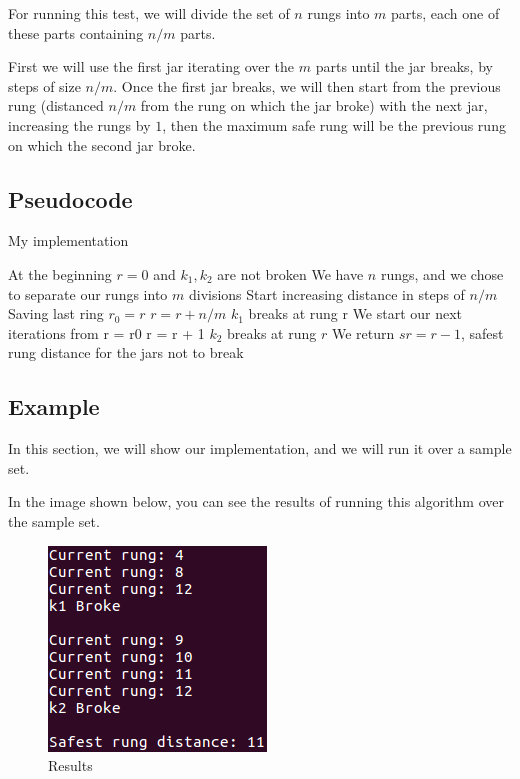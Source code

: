 \documentclass{article}
\begin{document}
For running this test, we will divide the set of $n$ rungs into $m$ parts, each one of these parts containing $n/m$ parts.

First we will use the first jar iterating over the $m$ parts until the jar breaks, by steps of size $n/m$. Once the first jar breaks, we will then start from the previous rung (distanced $n/m$ from the rung on which the jar broke) with the next jar, increasing the rungs by $1$, then the maximum safe rung will be the previous rung on which the second jar broke.
 
\subsection*{Pseudocode}

\begin{algorithm}[H]
\caption{My implementation}
\begin{algorithmic}[1]
\State At the beginning $r = 0$ and $k_1,k_2$ are not broken
\State We have $n$ rungs, and we chose to separate our rungs into $m$ divisions
 \State Start increasing distance in steps of $n/m$
 \State Saving last ring $r_0 = r$
 \State $r = r + n/m$
  \State $k_1$ breaks at rung r
 \EndIf
\EndWhile
\State We start our next iterations from r = r0
 \State r = r + 1
  \State $k_2$ breaks at rung $r$
  \State We return $sr = r-1$, safest rung distance for the jars not to break
 \EndIf 
\EndWhile
\end{algorithmic}
\end{algorithm}

\subsection*{Example}

In this section, we will show our implementation, and we will run it over a sample set.



In the image shown below, you can see the results of running this algorithm over the sample set.

\begin{figure}[H]
\begin{center}
\includegraphics[scale=.8]{problem1a}
\end{center}
\caption{Results}
\end{figure}
\end{document}

